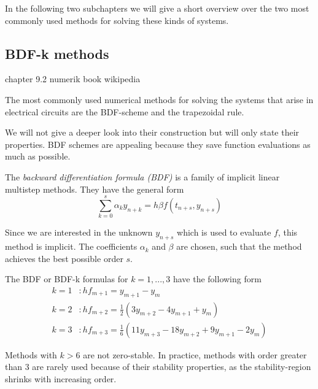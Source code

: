 In the following two subchapters we will give a short overview over the two most commonly used methods for solving these kinds of systems.

\subsection{BDF-k methods}
	\label{sec:BDFk}
	chapter 9.2 numerik book
	wikipedia
	
	The most commonly used numerical methods for solving the systems that arise in electrical circuits are the BDF-scheme and the trapezoidal rule. 
	
	We will not give a deeper look into their construction but will only state their properties. BDF schemes are appealing because they save function evaluations as much as possible.
	
	The \emph{backward differentiation formula (BDF)} is a family of implicit linear multistep methods. They have the general form
	\begin{equation}
		\sum_{k=0}^{s} \alpha_k y_{n+k} = h \beta f(t_{n+s}, y_{n+s})
	\end{equation}

	Since we are interested in the unknown $y_{n+s}$ which is used to evaluate $f$, this method is implicit. The coefficients $\alpha_k$ and $\beta$ are chosen, such that the method achieves the best possible order $s$.
	
	The BDF or BDF-k formulas for $k=1,...,3$ have the following form %
	\begin{align*}
		k = 1 &: h f_{m+1} = y_{m+1} - y_m \\
		k = 2 &: h f_{m+2} = \frac{1}{2} (3 y_{m+2} - 4 y_{m+1} + y_m) \\
		k = 3 &: h f_{m+3} = \frac{1}{6} (11 y_{m+3} - 18 y_{m+2} + 9 y_{m+1} - 2 y_m) %
	\end{align*}
	
	Methods with $k > 6$ are not zero-stable. In practice, methods with order greater than 3 are rarely used because of their stability properties, as the stability-region shrinks with increasing order.
	
